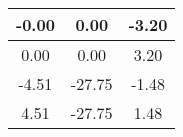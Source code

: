 \begin{tiny}\begin{tabular}{|c|c|c|}
\hline
-0.00&0.00&-3.20\\\hline
0.00&0.00&3.20\\\hline
-4.51&-27.75&-1.48\\\hline
4.51&-27.75&1.48\\\hline
\end{tabular}
\end{tiny}